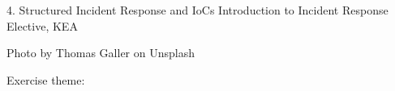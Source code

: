 \documentclass[Screen16to9,17pt]{foils}
\begin{document}
\mytitlepage
{4. Structured Incident Response and IoCs}
{Introduction to Incident Response Elective, KEA}




\begin{list2}
\item
\item
\item
\end{list2}

{\hfill \small Photo by Thomas Galler on Unsplash}


\begin{list2}
\item
\item
\item
\item
\item
\end{list2}

Exercise theme:
\begin{list2}
\item
\item
\item
\end{list2}


\end{document}
